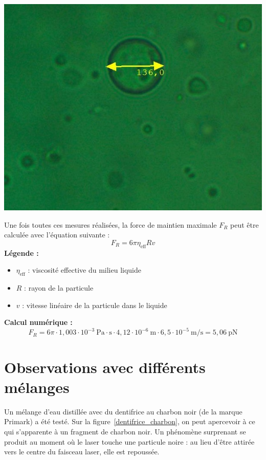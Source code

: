 \begin{minipage}{0.38\textwidth}
    \centering
    \includegraphics[width=\textwidth]{assets/figures/Notice de laboratoire/mesure_bead.jpg}
    \label{mesure_bead}
\end{minipage}
\newpage
Une fois toutes ces mesures réalisées, la force de maintien maximale \( F_R \) peut être calculée avec l'équation suivante :
\begin{equation}
    F_R = 6 \pi \eta_{\text{eff}} R v
\end{equation}
\textbf{Légende :}
\begin{itemize}[label=\textbullet]
    \item $\eta_{\text{eff}}$ : viscosité effective du milieu liquide
    \item $R$ : rayon de la particule
    \item $v$ : vitesse linéaire de la particule dans le liquide
\end{itemize}

\textbf{Calcul numérique :}
\[
    F_R = 6 \pi \cdot 1{,}003 \cdot 10^{-3}~\text{Pa}\cdot\text{s} \cdot 4{,}12 \cdot 10^{-6}~\text{m} \cdot 6{,}5 \cdot 10^{-5}~\text{m/s} = 5{,}06~\text{pN}
\]

\section{Observations avec différents mélanges}
Un mélange d'eau distillée avec du dentifrice au charbon noir (de la marque Primark) a été testé. Sur la figure~\ref{dentifrice_charbon}, on peut apercevoir à ce qui s'apparente à un fragment de charbon noir. Un phénomène surprenant se produit au moment où le laser touche une particule noire : au lieu d'être attirée vers le centre du faisceau laser, elle est repoussée.

